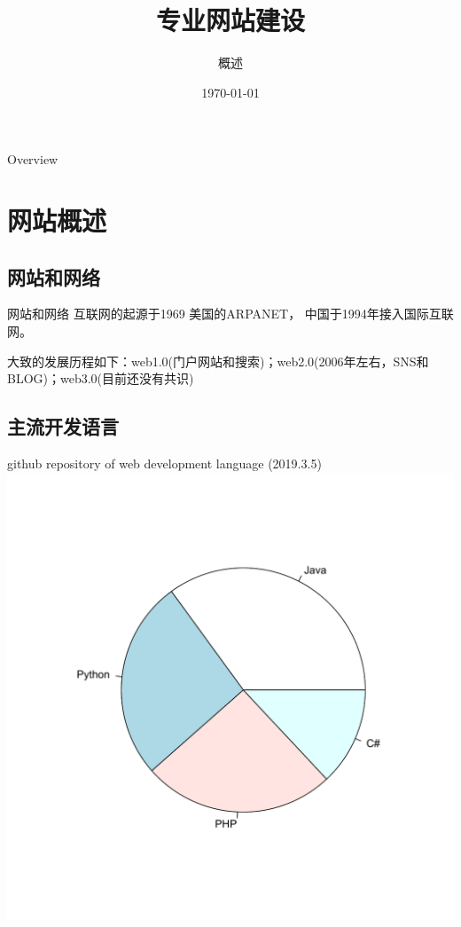\documentclass{beamer}
\title[专业网站建设]{专业网站建设} %
\subtitle{概述}
\author{} %
\institute[计算机科学与技术学院] %
{
贵州大学 \\ %
\medskip
\textit{hnzhang1@gzu.edu.cn} %
}
\date{\today} %
\begin{document}
\begin{frame}
\titlepage %
\end{frame}
\begin{frame}{Overview}
\tableofcontents
\end{frame}
\section{网站概述}
\subsection{网站和网络}
\begin{frame}{网站和网络}
互联网的起源于1969 美国的ARPANET，
中国于1994年接入国际互联网。

大致的发展历程如下：web1.0(门户网站和搜索)；web2.0(2006年左右，SNS和BLOG)；web3.0(目前还没有共识)
\end{frame}
\subsection{主流开发语言}
\begin{frame}{github repository of web development language (2019.3.5)}
\includegraphics[height=1\textheight]{webLanguage.pdf}
\end{frame}
\end{document}
